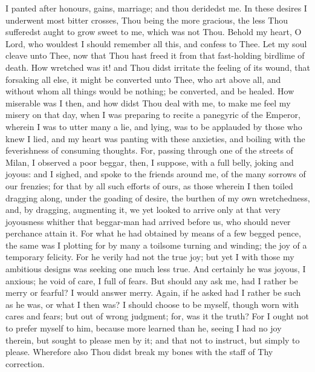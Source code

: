 \documentclass[b5paper,openright,12pt,twoside]{book}
\begin{document}
I panted after honours, gains, marriage; and thou deridedst me. In these
desires I underwent most bitter crosses, Thou being the more gracious,
the less Thou sufferedst aught to grow sweet to me, which was not Thou.
Behold my heart, O Lord, who wouldest I should remember all this, and
confess to Thee. Let my soul cleave unto Thee, now that Thou hast freed
it from that fast-holding birdlime of death. How wretched was it! and
Thou didst irritate the feeling of its wound, that forsaking all else,
it might be converted unto Thee, who art above all, and without whom all
things would be nothing; be converted, and be healed. How miserable was
I then, and how didst Thou deal with me, to make me feel my misery on
that day, when I was preparing to recite a panegyric of the Emperor,
wherein I was to utter many a lie, and lying, was to be applauded by
those who knew I lied, and my heart was panting with these anxieties,
and boiling with the feverishness of consuming thoughts. For, passing
through one of the streets of Milan, I observed a poor beggar, then, I
suppose, with a full belly, joking and joyous: and I sighed, and spoke
to the friends around me, of the many sorrows of our frenzies; for that
by all such efforts of ours, as those wherein I then toiled dragging
along, under the goading of desire, the burthen of my own wretchedness,
and, by dragging, augmenting it, we yet looked to arrive only at that
very joyousness whither that beggar-man had arrived before us, who
should never perchance attain it. For what he had obtained by means of a
few begged pence, the same was I plotting for by many a toilsome turning
and winding; the joy of a temporary felicity. For he verily had not the
true joy; but yet I with those my ambitious designs was seeking one much
less true. And certainly he was joyous, I anxious; he void of care, I
full of fears. But should any ask me, had I rather be merry or fearful?
I would answer merry. Again, if he asked had I rather be such as he was,
or what I then was? I should choose to be myself, though worn with cares
and fears; but out of wrong judgment; for, was it the truth? For I ought
not to prefer myself to him, because more learned than he, seeing I
had no joy therein, but sought to please men by it; and that not to
instruct, but simply to please. Wherefore also Thou didst break my bones
with the staff of Thy correction.
\end{document}
